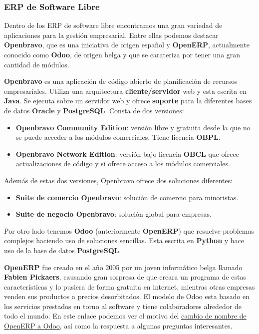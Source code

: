 \subsubsection{ERP de Software Libre}
Dentro de los ERP de software libre encontramos una gran variedad de aplicaciones para la gestión empresarial. Entre ellas podemos destacar \textbf{Openbravo}, que es una iniciativa de origen español y \textbf{OpenERP}, actualmente conocido como \textbf{Odoo}, de origen belga y que se carateriza por tener una gran cantidad de módulos.

\textbf{Openbravo} es una aplicación de código abierto de planificación de recursos empresariales. Utiliza una arquitectura \textbf{cliente/servidor} web y esta escrita en \textbf{Java}. Se ejecuta sobre un servidor web y ofrece \textbf{soporte} para la diferentes bases de datos \textbf{Oracle} y \textbf{PostgreSQL}. Consta de dos versiones:

\begin{itemize}
    \item \textbf{Openbravo Community Edition}: versión libre y gratuita desde la que no se puede acceder a los módulos comerciales. Tiene licencia \textbf{\gls{OBPL}}.
    \item \textbf{Openbravo Network Edition}: versión bajo licencia \textbf{\gls{OBCL}} que ofrece actualizaciones de código y si ofrece acceso a los módulos comerciales.
\end{itemize}

Además de estas dos versiones, Openbravo ofrece dos soluciones diferentes:

\begin{itemize}
    \item \textbf{Suite de comercio Openbravo}: solución de comercio para minoristas.
    \item \textbf{Suite de negocio Openbravo}: solución global para empresas.
\end{itemize}

Por otro lado tenemos \textbf{Odoo} (anteriormente \textbf{OpenERP}) que resuelve problemas complejos haciendo uso de soluciones sencillas. Esta escrita en \textbf{Python} y hace uso de la base de datos \textbf{PostgreSQL}.

\textbf{OpenERP} fue creado en el año 2005 por un joven informático belga llamado \textbf{Fabien Pickaers}, causando gran sorpresa de que creara un programa de estas características y lo pusiera de forma gratuita en internet, mientras otras empresas venden sus productos a precios desorbitados. El modelo de Odoo esta basado en los servicios prestados en torno al software y tiene colaboradores alrededor de todo el mundo. En este enlace podemos ver el motivo del \href{https://openerpspain.com/}{cambio de nombre de OpenERP a Odoo}, así como la respuesta a algunas preguntas interesantes.

